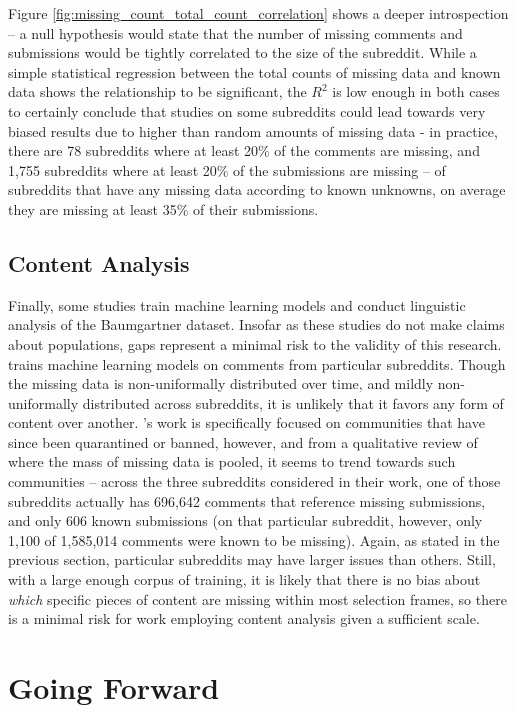 \documentclass[letterpaper,12pt]{article}
\begin{document}
Figure \ref{fig:missing_count_total_count_correlation} shows a deeper introspection -- a null hypothesis would state that the number of missing comments and submissions would be tightly correlated to the size of the subreddit. While a simple statistical regression between the total counts of missing data and known data shows the relationship to be significant, the $R^2$ is low enough in both cases to certainly conclude that studies on some subreddits could lead towards very biased results due to higher than random amounts of missing data - in practice, there are 78 subreddits where at least 20\% of the comments are missing, and 1,755 subreddits where at least 20\% of the submissions are missing -- of subreddits that have any missing data according to known unknowns, on average they are missing at least 35\% of their submissions.

\subsection{Content Analysis}

Finally, some studies train machine learning models and conduct linguistic analysis of the Baumgartner dataset. Insofar as these studies do not make claims about populations, gaps represent a minimal risk to the validity of this research.  trains machine learning models on comments from particular subreddits. Though the missing data is non-uniformally distributed over time, and mildly non-uniformally distributed across subreddits, it is unlikely that it favors any form of content over another. 's work is specifically focused on communities that have since been quarantined or banned, however, and from a qualitative review of where the mass of missing data is pooled, it seems to trend towards such communities -- across the three subreddits considered in their work, one of those subreddits actually has 696,642 comments that reference missing submissions, and only 606 known submissions (on that particular subreddit, however, only 1,100 of 1,585,014 comments were known to be missing). Again, as stated in the previous section, particular subreddits may have larger issues than others. Still, with a large enough corpus of training, it is likely that there is no bias about \textit{which} specific pieces of content are missing within most selection frames, so there is a minimal risk for work employing content analysis given a sufficient scale.

\section{Going Forward}
\end{document}
